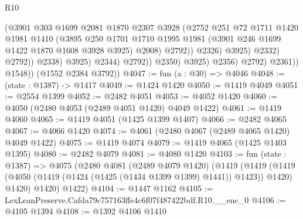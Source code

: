 \begin{lexlean}{R10}
\begin{coremodule}
                                          (@3901
                                            @303
                                            @1699
                                            @2081
                                            @1870
                                            @2307
                                            @3928
                                            (@2752
                                              @251
                                              @72
                                              @1711
                                              @1420
                                              @1981
                                              @1410
                                              (@3895
                                                @250
                                                @1701
                                                @1710
                                                @1995
                                                @1981
                                                (@3901 @246 @1699 @1422 @1870 @1608 @3928 @3925)
                                                @2008)
                                              @2792))
                                          @2326)
                                        @3925)
                                      @2332)
                                    @2792))
                                @2338)
                              @3925)
                            @2344)
                          @2792))
                      @2350)
                    @3925)
                  @2356)
                @2792)
              @2361))
          @1548))
      (@1552 @2384 @3792))
@4047 := fun (a : @30) => @4046
@4048 := (state : @1387) -> @1417
@4049 := @1424 @1420
@4050 := @1419 @4049
@4051 := @2554 @1399
@4052 := @2482 @4051
@4053 := @4052 @1420
@4060 := @4050 (@2480 @4053 (@2489 @4051 @1420) @4049 @1422)
@4061 := @1419 @4060
@4065 := @1419 @4051 (@1425 @1399 @1407)
@4066 := @2482 @4065
@4067 := @4066 @1420
@4074 := @4061 (@2480 @4067 (@2489 @4065 @1420) @4049 @1422)
@4075 := @1419 @4074
@4079 := @1419 @4065 (@1425 @1403 @1395)
@4080 := @2482 @4079
@4081 := @4080 @1420
@4103 := fun (state : @1387) =>
  @4075
    (@2480
      @4081
      (@2489 @4079 @1420)
      (@1419
        (@1419 (@1419 (@4050 (@1419 (@1424 (@1425 (@1434 @1399 @1399) @1441)) @1423)) @1420) @1420)
        @1420)
      @1422)
@4104 := @1447 @1162
@4105 := LexLeanPreserve.Cafda79c757163ffe4c6f07f487422bdf.R10.__enc_0
@4106 := @4105 @1394
@4108 := @1392 @4106 @1410

\end{coremodule}
\end{lexlean}
